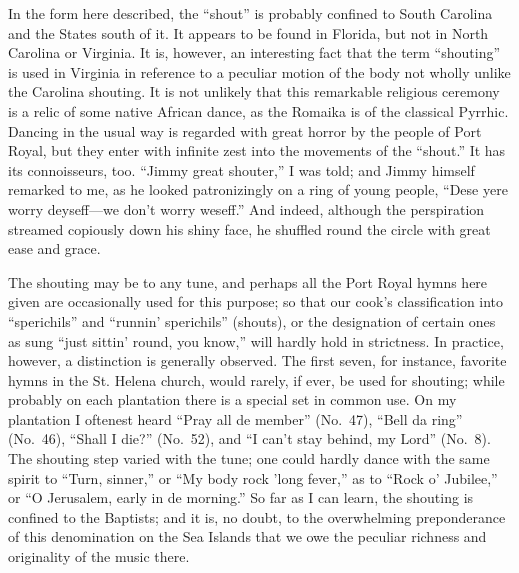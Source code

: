 \documentclass[a5paper,10pt]{book}
\begin{document}
In the form here described, the ``shout'' is probably confined to
South Carolina and the States south of it.  It appears to be found in
Florida, but not in North Carolina or Virginia.  It is, however, an
interesting fact that the term ``shouting'' is used in Virginia in
reference to a peculiar motion of the body not wholly unlike the
Carolina shouting.  It is not unlikely that this remarkable religious
ceremony is a relic of some native African dance, as the Romaika is of
the classical Pyrrhic.  Dancing in the usual way is regarded with
great horror by the people of Port Royal, but they enter with infinite
zest into the movements of the ``shout.''  It has its connoisseurs,
too.  ``Jimmy great shouter,'' I was told; and Jimmy himself remarked
to me, as he looked patronizingly on a ring of young people, ``Dese
yere worry deyseff---we don't worry weseff.''  And indeed, although
the perspiration streamed copiously down his shiny face, he shuffled
round the circle with great ease and grace.

The shouting may be to any tune, and perhaps all the Port Royal hymns
here given are occasionally used for this purpose; so that our cook's
classification into ``sperichils'' and ``runnin' sperichils''
(shouts), or the designation of certain ones as sung ``just sittin'
round, you know,'' will hardly hold in strictness.  In practice,
however, a distinction is generally observed.  The first seven, for
instance, favorite hymns in the St. Helena church, would rarely, if
ever, be used for shouting; while probably on each plantation there is
a special set in common use.  On my plantation I oftenest heard ``Pray
all de member'' (No.~47), ``Bell da ring'' (No.~46), ``Shall I die?''
(No.~52), and ``I can't stay behind, my Lord'' (No.~8).  The shouting
step varied with the tune; one could hardly dance with the same spirit
to ``Turn, sinner,'' or ``My body rock 'long fever,'' as to ``Rock o'
Jubilee,'' or ``O Jerusalem, early in de morning.''  So far as I can
learn, the shouting is confined to the Baptists; and it is, no doubt,
to the overwhelming preponderance of this denomination on the Sea
Islands that we owe the peculiar richness and originality of the music
there.
\end{document}
